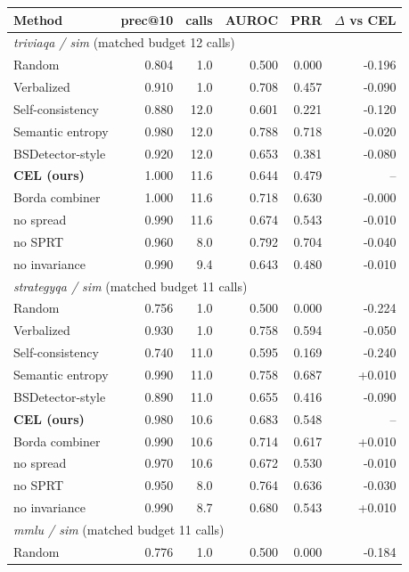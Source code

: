 \begin{table}[t]
\centering
\small
\begin{tabular}{lrrrrr}
\toprule
Method & prec@10 & calls & AUROC & PRR & $\Delta$ vs CEL \\
\midrule
\multicolumn{6}{l}{\emph{triviaqa / sim} (matched budget 12 calls)} \\
Random & 0.804 & 1.0 & 0.500 & 0.000 & -0.196 \\
Verbalized & 0.910 & 1.0 & 0.708 & 0.457 & -0.090 \\
Self-consistency & 0.880 & 12.0 & 0.601 & 0.221 & -0.120 \\
Semantic entropy & 0.980 & 12.0 & 0.788 & 0.718 & -0.020 \\
BSDetector-style & 0.920 & 12.0 & 0.653 & 0.381 & -0.080 \\
\textbf{CEL (ours)} & 1.000 & 11.6 & 0.644 & 0.479 & -- \\
\quad Borda combiner & 1.000 & 11.6 & 0.718 & 0.630 & -0.000 \\
\quad no spread & 0.990 & 11.6 & 0.674 & 0.543 & -0.010 \\
\quad no SPRT & 0.960 & 8.0 & 0.792 & 0.704 & -0.040 \\
\quad no invariance & 0.990 & 9.4 & 0.643 & 0.480 & -0.010 \\
\multicolumn{6}{l}{\emph{strategyqa / sim} (matched budget 11 calls)} \\
Random & 0.756 & 1.0 & 0.500 & 0.000 & -0.224 \\
Verbalized & 0.930 & 1.0 & 0.758 & 0.594 & -0.050 \\
Self-consistency & 0.740 & 11.0 & 0.595 & 0.169 & -0.240 \\
Semantic entropy & 0.990 & 11.0 & 0.758 & 0.687 & +0.010 \\
BSDetector-style & 0.890 & 11.0 & 0.655 & 0.416 & -0.090 \\
\textbf{CEL (ours)} & 0.980 & 10.6 & 0.683 & 0.548 & -- \\
\quad Borda combiner & 0.990 & 10.6 & 0.714 & 0.617 & +0.010 \\
\quad no spread & 0.970 & 10.6 & 0.672 & 0.530 & -0.010 \\
\quad no SPRT & 0.950 & 8.0 & 0.764 & 0.636 & -0.030 \\
\quad no invariance & 0.990 & 8.7 & 0.680 & 0.543 & +0.010 \\
\multicolumn{6}{l}{\emph{mmlu / sim} (matched budget 11 calls)} \\
Random & 0.776 & 1.0 & 0.500 & 0.000 & -0.184 \\

\end{tabular}
\end{table}
